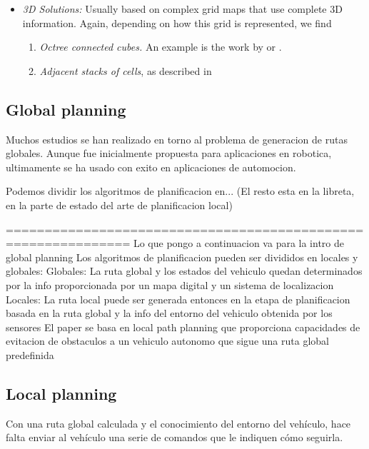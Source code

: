 \begin{itemize}
\begin{enumerate}
  \end{enumerate} 
 \item \emph{3D Solutions:} Usually based on complex grid maps that use complete 3D information. Again, depending on how this grid is represented, we find 
 \begin{enumerate}
   \item \emph{Octree connected cubes.} An example is the work by \cite{wurm2010octomap} or \cite{broggi2013}.
   \item \emph{Adjacent stacks of cells}, as described in \cite{Moravec96robotspatial} 
 \end{enumerate}
\end{itemize}

\subsection{Global planning}\label{ch:chapter01_02_06}

Muchos estudios se han realizado en torno al problema de generacion de rutas globales. Aunque fue inicialmente propuesta para aplicaciones en robotica, ultimamente se ha usado con exito en aplicaciones de automocion.

Podemos dividir los algoritmos de planificacion en... (El resto esta en la libreta, en la parte de estado del arte de planificacion local)


==============================================================
Lo que pongo a continuacion va para la intro de global planning
Los algoritmos de planificacion pueden ser divididos en locales y globales:
Globales:
  La ruta global y los estados del vehiculo quedan determinados por la info proporcionada por un mapa digital y un sistema de localizacion
Locales:
  La ruta local puede ser generada entonces en la etapa de planificacion basada en la ruta global y la info del entorno del vehiculo obtenida por los sensores
  El paper se basa en local path planning que proporciona capacidades de evitacion de obstaculos a un vehiculo autonomo que sigue una ruta global predefinida


\subsection{Local planning}\label{ch:chapter01_02_03}

Con una ruta global calculada y el conocimiento del entorno del vehículo, hace falta enviar al vehículo una serie de comandos que le indiquen cómo seguirla.

